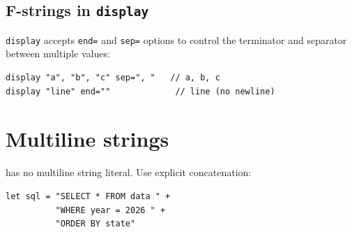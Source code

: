 \subsection*{F-strings in \texttt{display}}

\lstinline{display} accepts \lstinline{end=} and \lstinline{sep=} options
to control the terminator and separator between multiple values:

\begin{lstlisting}
display "a", "b", "c" sep=", "   // a, b, c
display "line" end=""             // line (no newline)
\end{lstlisting}

\section{Multiline strings}

\hayashi{} has no multiline string literal. Use explicit concatenation:

\begin{lstlisting}
let sql = "SELECT * FROM data " +
          "WHERE year = 2026 " +
          "ORDER BY state"
\end{lstlisting}
